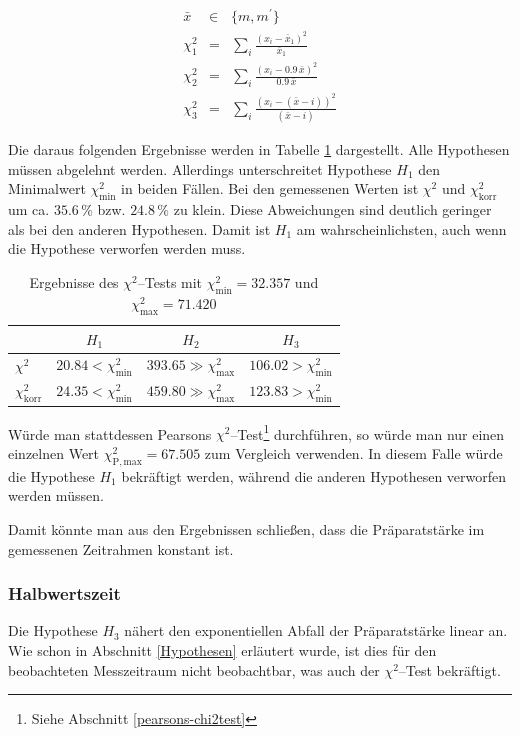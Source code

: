 \documentclass[12pt,a4paper]{scrartcl}
\numberwithin{equation}{section} %
\begin{document}
\begin{eqnarray}
	\bar x &\in& \{m, m^\prime\} \\
	\chi^2_1 &=& \sum_i \frac{(x_i-\bar x_1)^2}{\bar x_1} \\
	\chi^2_2 &=& \sum_i \frac{(x_i-0.9\,\bar x)^2}{0.9\,\bar x} \\
	\chi^2_3 &=& \sum_i \frac{(x_i-(\bar{x} - i))^2}{(\bar{x} - i)}
\end{eqnarray}

\noindent
Die daraus folgenden Ergebnisse werden in Tabelle \ref{tab:ChiSquared} dargestellt. Alle Hypothesen müssen abgelehnt werden. Allerdings unterschreitet Hypothese $H_1$ den Minimalwert $\chi^2_\mathrm{min}$ in beiden Fällen. Bei den gemessenen Werten ist $\chi^2$ und $\chi^2_\mathrm{korr}$ um ca. $35.6\,\%$ bzw. $24.8\,\%$ zu klein. Diese Abweichungen sind deutlich geringer als bei den anderen Hypothesen. Damit ist $H_1$ am wahrscheinlichsten, auch wenn die Hypothese verworfen werden muss.

\begin{table}[h]
	\centering
	\begin{tabular}{l|c|c|c}
			& $H_1$
			& $H_2$
			& $H_3$ \\
		\hline
		$\chi^2$
			& $20.84 < \chi^2_\mathrm{min}$
			& $393.65 \gg \chi^2_\mathrm{max}$
			& $106.02 > \chi^2_\mathrm{min}$
		\\
		$\chi^2_\mathrm{korr}$
			& $24.35 < \chi^2_\mathrm{min}$
			& $459.80 \gg \chi^2_\mathrm{max}$
			& $123.83 > \chi^2_\mathrm{min}$
	\end{tabular}
	\caption{Ergebnisse des $\chi^2$--Tests mit $\chi^2_\mathrm{min} = 32.357$ und $\chi^2_\mathrm{max} = 71.420$ \cite{Kapur}}
	\label{tab:ChiSquared}
\end{table}

\noindent
Würde man stattdessen Pearsons $\chi^2$--Test\footnote{Siehe Abschnitt \ref{pearsons-chi2test}} durchführen, so würde man nur einen einzelnen Wert $\chi_\mathrm{P, max}^2 = 67.505$ zum Vergleich verwenden. \cite{Kapur} In diesem Falle würde die Hypothese $H_1$ bekräftigt werden, während die anderen Hypothesen verworfen werden müssen.

Damit könnte man aus den Ergebnissen schließen, dass die Präparatstärke im gemessenen Zeitrahmen konstant ist.

\hypertarget{totzeit}{\subsubsection{Halbwertszeit}\label{totzeit}}
Die Hypothese $H_3$ nähert den exponentiellen Abfall der Präparatstärke linear an. Wie schon in Abschnitt \ref{Hypothesen} erläutert wurde, ist dies für den beobachteten Messzeitraum nicht beobachtbar, was auch der $\chi^2$--Test bekräftigt.
\end{document}
